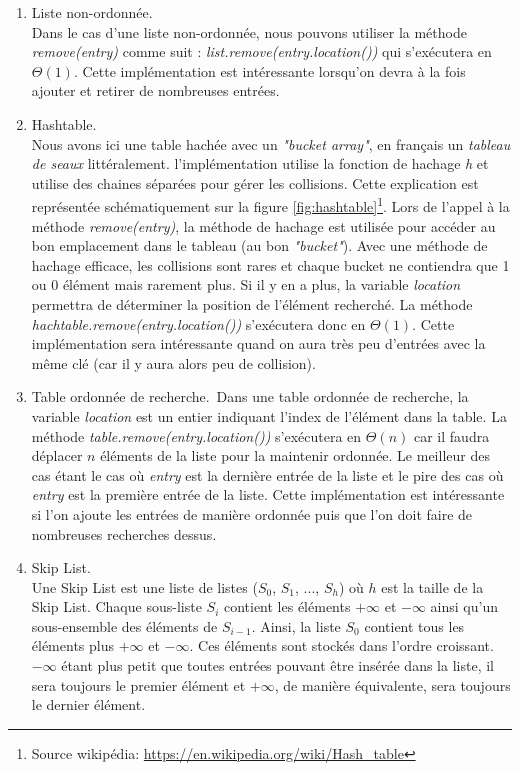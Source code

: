 \begin{enumerate}
	\item Liste non-ordonnée.\\
			Dans le cas d'une liste non-ordonnée, nous pouvons utiliser la méthode \textit{remove(entry)} comme suit : \textit{list.remove(entry.location())} qui s'exécutera en $\Theta(1)$.
			Cette implémentation est intéressante lorsqu'on devra à la fois ajouter et retirer de nombreuses entrées.
	\item Hashtable.\\
			Nous avons ici une table hachée avec un \textit{"bucket array"},  en français un \textit{tableau de seaux} littéralement. l'implémentation utilise la fonction de hachage \textit{h} et utilise des chaines séparées pour gérer les collisions. Cette explication est représentée schématiquement sur la figure \ref{fig:hashtable}\footnote{Source wikipédia: \url{https://en.wikipedia.org/wiki/Hash_table}}. Lors de l'appel à la méthode \textit{remove(entry)}, la méthode de hachage est utilisée pour accéder au bon emplacement dans le tableau (au bon \textit{"bucket"}). Avec une méthode de hachage efficace, les collisions sont rares et chaque bucket ne contiendra que 1 ou 0 élément mais rarement plus. Si il y en a plus, la variable \textit{location} permettra de déterminer la position de l'élément recherché. La méthode \textit{hachtable.remove(entry.location())} s'exécutera donc en $\Theta(1)$.
			Cette implémentation sera intéressante quand on aura très peu d'entrées avec la même clé (car il y aura alors peu de collision).
	\item Table ordonnée de recherche.\
			Dans une table ordonnée de recherche, la variable \textit{location} est un entier indiquant l'index de l'élément dans la table.
			La méthode \textit{table.remove(entry.location())} s'exécutera en $\Theta(n)$ car il faudra déplacer $n$ éléments de la liste pour la maintenir ordonnée. Le meilleur des cas étant le cas où \textit{entry} est la dernière entrée de la liste et le pire des cas où \textit{entry} est la première entrée de la liste.
			Cette implémentation est intéressante si l'on ajoute les entrées de manière ordonnée puis que l'on doit faire de nombreuses recherches dessus.
	\item Skip List.\\
			Une Skip List est une liste de listes ($S_0$, $S_1$, $...$, $S_h$) où $h$ est la taille de la Skip List.
			Chaque sous-liste $S_i$ contient les éléments $+\infty$ et $-\infty$ ainsi qu'un sous-ensemble des éléments de $S_{i-1}$.
			Ainsi, la liste $S_0$ contient tous les éléments plus $+\infty$ et $-\infty$. Ces éléments sont stockés dans l'ordre croissant. $-\infty$ étant plus petit que toutes entrées pouvant être insérée dans la liste, il sera toujours le premier élément et $+\infty$, de manière équivalente, sera toujours le dernier élément.

\end{enumerate}
